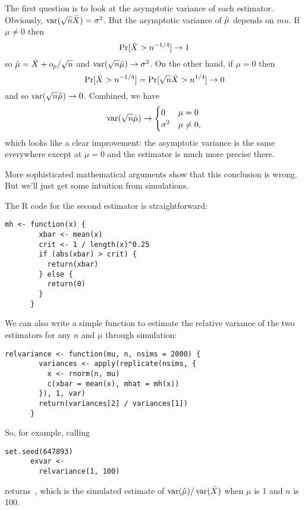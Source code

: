 \begin{itemize}[leftmargin=0pt]
\begin{ex}
    The first question is to look at the asymptotic variance of each
    estimator.  Obviously, $\operatorname{var}(\sqrt{n} \bar{X}) = \sigma^2$.  But the
    asymptotic variance of $\hat{\mu}$ depends on $mu$.  If $\mu \neq 0$
    then
    \begin{equation*}
      \operatorname{Pr}[ \bar{X} > n^{-1/4} ] \to 1
    \end{equation*}
    so $\hat{\mu} = \bar{X} + o_p/\sqrt{n}$ and $\operatorname{var}(\sqrt{n} \hat{\mu}) \to
    \sigma^2$.  On the other hand, if $\mu = 0$ then
    \begin{equation*}
      \operatorname{Pr}[ \bar{X} > n^{-1/4} ] = \operatorname{Pr}[ \sqrt{n} \bar{X} > n^{1/4} ] \to 0
    \end{equation*}
    and so $\operatorname{var}(\sqrt{n} \hat{\mu}) \to 0$.  Combined, we have
    \begin{equation*}
      \operatorname{var}(\sqrt{n} \hat{\mu}) \to
      \begin{cases}
        0        & \mu = 0 \\
        \sigma^2 & \mu \neq 0,
      \end{cases}
    \end{equation*}
    which looks like a clear improvement: the asymptotic variance is
    the same everywhere except at $\mu = 0$ and the estimator is much
    more precise there.

    More sophisticated mathematical arguments show that this
    conclusion is wrong.  But we'll just get some intuition from
    simulations.

    The R code for the second estimator is straightforward:
    \begin{lstlisting}[gobble=6]
      mh <- function(x) {
        xbar <- mean(x)
        crit <- 1 / length(x)^0.25
        if (abs(xbar) > crit) {
          return(xbar)
        } else {
          return(0)
        }
      }
    \end{lstlisting}
    We can also write a simple function to estimate the relative
    variance of the two estimators for any $n$ and $\mu$ through
    simulation:
    \begin{lstlisting}[gobble=6]
      relvariance <- function(mu, n, nsims = 2000) {
        variances <- apply(replicate(nsims, {
          x <- rnorm(n, mu)
          c(xbar = mean(x), mhat = mh(x))
        }), 1, var)
        return(variances[2] / variances[1])
      }
    \end{lstlisting}
    So, for example, calling
    \begin{lstlisting}[firstline=3,lastline=3,gobble=6]
      set.seed(647893)
      exvar <-
        relvariance(1, 100)
    \end{lstlisting}
    returns~\exvar, which is the simulated estimate of $\operatorname{var}(\hat{\mu})
    / \operatorname{var}(\bar{X})$ when $\mu$ is 1 and $n$ is 100.


\end{ex}
\end{itemize}
